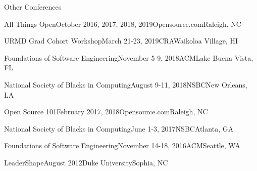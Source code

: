 \documentclass{resume} %
\begin{document}
\begin{rSection}{Other Conferences}
\begin{sSubsection}{All Things Open}{October 2016, 2017, 2018, 2019}{Opensource.com}{Raleigh, NC}
\end{sSubsection}
\vspace{-5pt}
\begin{sSubsection}{URMD Grad Cohort Workshop}{March 21-23, 2019}{CRA}{Waikoloa Village, HI}
\end{sSubsection}
\vspace{-5pt}
\begin{sSubsection}{Foundations of Software Engineering}{November 5-9, 2018}{ACM}{Lake Buena Vista, FL}
\end{sSubsection}
\vspace{-5pt}
\begin{sSubsection}{National Society of Blacks in Computing}{August 9-11, 2018}{NSBC}{New Orleans, LA}
\end{sSubsection}
\vspace{-5pt}
\begin{sSubsection}{Open Source 101}{February 2017, 2018}{Opensource.com}{Raleigh, NC}
\end{sSubsection}
\vspace{-5pt}
\begin{sSubsection}{National Society of Blacks in Computing}{June 1-3, 2017}{NSBC}{Atlanta, GA}
\end{sSubsection}
\vspace{-5pt}
\begin{sSubsection}{Foundations of Software Engineering}{November 14-18, 2016}{ACM}{Seattle, WA}
\end{sSubsection}
\vspace{-5pt}
\begin{sSubsection}
{LeaderShape}{August 2012}{Duke University}{Sophia, NC}
\end{sSubsection}
\vspace{-5pt}
\end{rSection}
\end{document}

